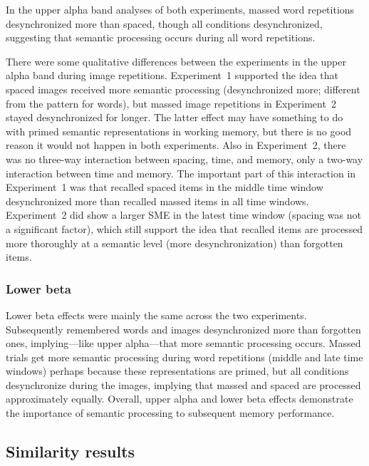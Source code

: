 In the upper alpha band analyses of both experiments, massed word repetitions desynchronized more than spaced, though all conditions desynchronized, suggesting that semantic processing occurs during all word repetitions.

There were some qualitative differences between the experiments in the upper alpha band during image repetitions.  Experiment~1 supported the idea that spaced images received more semantic processing (desynchronized more; different from the pattern for words), but massed image repetitions in Experiment~2 stayed desynchronized for longer.  The latter effect may have something to do with primed semantic representations in working memory, but there is no good reason it would not happen in both experiments.  Also in Experiment~2, there was no three-way interaction between spacing, time, and memory, only a two-way interaction between time and memory.  The important part of this interaction in Experiment~1 was that recalled spaced items in the middle time window desynchronized more than recalled massed items in all time windows.  Experiment~2 did show a larger SME in the latest time window (spacing was not a significant factor), which still support the idea that recalled items are processed more thoroughly at a semantic level (more desynchronization) than forgotten items.



\subsubsection{Lower beta}

Lower beta effects were mainly the same across the two experiments.  Subsequently remembered words and images desynchronized more than forgotten ones, implying---like upper alpha---that more semantic processing occurs.
Massed trials get more semantic processing during word repetitions (middle and late time windows) perhaps because these representations are primed, but all conditions desynchronize during the images, implying that massed and spaced are processed approximately equally.  Overall, upper alpha and lower beta effects demonstrate the importance of semantic processing to subsequent memory performance.

\subsection{Similarity results}


